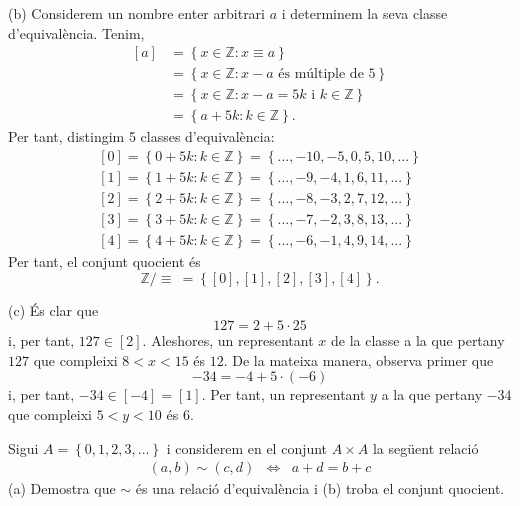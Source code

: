 \begin{solucio}
(b) Considerem un nombre enter arbitrari $a$ i determinem la seva classe
d'equival\`{e}ncia. Tenim,%
\begin{align*}
\left[ a\right] & =\left\{ x\in \mathbb{Z}:x\equiv a\right\} \\
& =\left\{ x\in \mathbb{Z}:x-a\text{ \ \'{e}s m\'{u}ltiple de }5\right\} \\
& =\left\{ x\in \mathbb{Z}:x-a=5k\text{ \ i \ }k\in \mathbb{Z}\right\} \\
& =\left\{ a+5k:k\in \mathbb{Z}\right\} \text{.}
\end{align*}%
Per tant, distingim 5 classes d'equival\`{e}ncia:%
\begin{equation*}
\begin{array}{c}
\left[ 0\right] =\left\{ 0+5k:k\in \mathbb{Z}\right\} =\left\{
...,-10,-5,0,5,10,...\right\} \\
\left[ 1\right] =\left\{ 1+5k:k\in \mathbb{Z}\right\} =\left\{
...,-9,-4,1,6,11,...\right\} \\
\left[ 2\right] =\left\{ 2+5k:k\in \mathbb{Z}\right\} =\left\{
...,-8,-3,2,7,12,...\right\} \\
\left[ 3\right] =\left\{ 3+5k:k\in \mathbb{Z}\right\} =\left\{
...,-7,-2,3,8,13,...\right\} \\
\left[ 4\right] =\left\{ 4+5k:k\in \mathbb{Z}\right\} =\left\{
...,-6,-1,4,9,14,...\right\}%
\end{array}%
\end{equation*}%
Per tant, el conjunt quocient \'{e}s%
\begin{equation*}
\mathbb{Z}/\equiv ~=\left\{ \left[ 0\right] ,\left[ 1\right] ,\left[ 2\right]
,\left[ 3\right] ,\left[ 4\right] \right\} \text{.}
\end{equation*}

(c) \'{E}s clar que%
\begin{equation*}
127=2+5\cdot 25
\end{equation*}%
i, per tant, $127\in \left[ 2\right] $. Aleshores, un representant $x$ de la
classe a la que pertany $127$ que compleixi $8<x<15$ \'{e}s $12$. De la
mateixa manera, observa primer que%
\begin{equation*}
-34=-4+5\cdot (-6)
\end{equation*}%
i, per tant, $-34\in \left[ -4\right] =\left[ 1\right] $. Per tant, un
representant $y$ a la que pertany $-34$ que compleixi $5<y<10$ \'{e}s $6$.
\end{solucio}

\begin{exercici}
Sigui $A=\left\{ 0,1,2,3,...\right\} $ i considerem en el conjunt $A\times A$
la seg\"{u}ent relaci\'{o}%
\begin{equation*}
\begin{array}{ccc}
(a,b)\sim (c,d) & \Longleftrightarrow & a+d=b+c%
\end{array}%
\end{equation*}%
(a) Demostra que $\sim $ \'{e}s una relaci\'{o} d'equival\`{e}ncia i (b)
troba el conjunt quocient.
\end{exercici}


